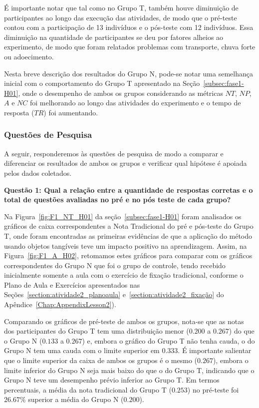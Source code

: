 É importante notar que tal como no Grupo T, também houve diminuição de participantes ao longo das execução das atividades, de modo que o pré-teste contou com a participação de 13 indivíduos e o pós-teste com 12 indivíduos. Essa diminuição na quantidade de participantes se deu por fatores alheios ao experimento, de modo que foram relatados problemas com transporte, chuva forte ou adoecimento.

Nesta breve descrição dos resultados do Grupo N, pode-se notar uma semelhança inicial com o comportamento do Grupo T apresentado na Seção~\ref{subsec:fase1-H01}, onde o desempenho de ambos os grupos considerando as métricas $NT$, $NP$, $A$ e $NC$ foi melhorando ao longo das atividades do experimento e o tempo de resposta ($TR$) foi aumentando.

\subsubsection{Questões de Pesquisa}\label{subsubsection:QP_F1H2}
A seguir, responderemos às questões de pesquisa de modo a comparar e diferenciar os resultados de ambos os grupos e verificar qual hipótese é apoiada pelos dados coletados.

\textbf{Questão 1: Qual a relação entre a quantidade de respostas corretas e o total de questões avaliadas no pré e no pós teste de cada grupo?}

Na Figura~\ref{fig:F1_NT_H01} da seção~\ref{subsec:fase1-H01} foram analisados os gráficos de caixa correspondentes a Nota Tradicional do pré e pós-teste do Grupo T, onde foram encontradas as primeiras evidências de que a aplicação do método usando objetos tangíveis teve um impacto positivo na aprendizagem. Assim, na Figura~\ref{fig:F1_A_H02}, retomamos estes gráficos para comparar com os gráficos correspondentes do Grupo N que foi o grupo de controle, tendo recebido inicialmente somente a aula com o exercício de fixação tradicional, conforme o Plano de Aula e Exercícios apresentados nas Seções~\ref{section:atividade2_planoaula} e~\ref{section:atividade2_fixação} do Apêndice~\ref{Chap:AppendixLesson2}).

Comparando os gráficos de pré-teste de ambos os grupos, nota-se que as notas dos participantes do Grupo T tem uma distribuição menor ($0.200$ a $0.267$) do que o Grupo N ($0.133$ a $0.267$) e, embora o gráfico do Grupo T não tenha cauda, o do Grupo N tem uma cauda com o limite superior em $0.333$. É importante salientar que o limite superior da caixa de ambos os grupos é o mesmo ($0.267$), embora o limite inferior do Grupo N seja mais baixo do que o do Grupo T, indicando que o Grupo N teve um desempenho prévio inferior ao Grupo T. Em termos percentuais, a média da nota tradicional do Grupo T ($0.253$) no pré-teste foi $26.67\%$ superior a média do Grupo N ($0.200$).

